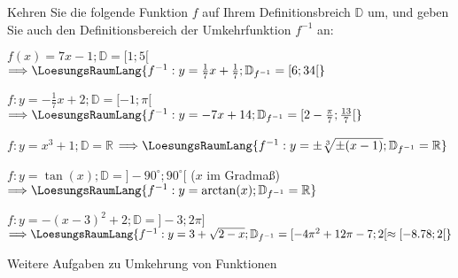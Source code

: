 

\renewcommand{\bbwAufgabenBlockID}{Finv}

\renewcommand{\metaHeaderLine}{Funktionen}
\renewcommand{\arbeitsblattTitel}{Umkehrfunktionen}



\arbeitsblattHeader{}

Kehren Sie die folgende Funktion $f$ auf Ihrem Definitionsbreich
$\mathbb{D}$ um, und geben Sie auch den Definitionsbereich der
Umkehrfunktion $f^{-1}$ an:


\begin{bbwAufgabenBlock}
\item $f(x) = 7x-1; \mathbb{D} = [1;5[$
$\Longrightarrow \LoesungsRaumLang{
f^{-1}: y=\frac17 x + \frac17; \mathbb{D}_{f^{-1}} = [6;34[
}$

\item $f:  y = -\frac17x + 2; \mathbb{D} = [-1;\pi[$
$\Longrightarrow \LoesungsRaumLang{
f^{-1}: y=-7x+14; \mathbb{D}_{f^{-1}} = [2-\frac{\pi}{7};\frac{13}{7}[
}$

\item $f:  y = x^3  + 1; \mathbb{D} = \mathbb{R}$
$\Longrightarrow \LoesungsRaumLang{
f^{-1}: y=\pm\sqrt[3]{\pm(x-1)}; \mathbb{D}_{f^{-1}} = \mathbb{R}
}$

\item $f:  y = \tan(x); \mathbb{D} = ]-90^{\circ};90^{\circ}[$ ($x$ im Gradmaß)
$\Longrightarrow \LoesungsRaumLang{
f^{-1}: y=\arctan(x); \mathbb{D}_{f^{-1}} = \mathbb{R}
}$

\item $f:  y = -(x-3)^2 + 2; \mathbb{D} = ]-3;2\pi]$
$\Longrightarrow \LoesungsRaumLang{
f^{-1}: y=3+\sqrt{2-x}; \mathbb{D}_{f^{-1}} = [-4\pi^2+12\pi-7;2[
\approx{} [-8.78;2[
}$

\end{bbwAufgabenBlock}

\platzFuerBerechnungenBisEndeSeite{}



Weitere Aufgaben zu Umkehrung von Funktionen

